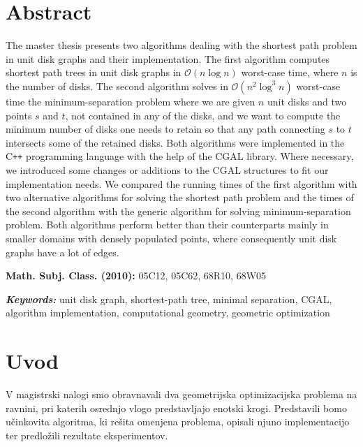 \documentclass[a4paper, 12pt]{book}
\newcommand{\OO}{\ensuremath{\mathcal{O}}} %
\newcommand{\clearemptydoublepage}{\newpage{\pagestyle{empty}\cleardoublepage}}
\begin{document}
\chapter*{Abstract}
The master thesis presents two algorithms dealing with the shortest path problem in unit disk graphs and their implementation. The first algorithm computes shortest path trees in unit disk graphs in $\OO(n\log n)$ worst-case time, where $n$ is the number of disks. The second algorithm solves in $\OO(n^2\log^3n)$ worst-case time the minimum-separation problem where we are given $n$ unit disks and two points $s$ and $t$, not contained in any of the disks, and we want to compute the minimum number of disks one needs to retain so that any path connecting $s$ to $t$ intersects some of the retained disks. Both algorithms were implemented in the C\texttt{+}\texttt{+} programming language with the help of the CGAL library. Where necessary, we introduced some changes or additions to the CGAL structures to fit our implementation needs. We compared the running times of the first algorithm with two alternative algorithms for solving the shortest path problem and the times of the second algorithm with the generic algorithm for solving minimum-separation problem. Both algorithms perform better than their counterparts mainly in smaller domains with densely populated points, where consequently unit disk graphs have a lot of edges.
\bigbreak

\begin{flushleft}
\textbf{Math. Subj. Class. (2010): } 05C12, 05C62, 68R10, 68W05

\textbf{\textit{Keywords: }}unit disk graph, shortest-path tree, minimal separation, CGAL, algorithm implementation, computational geometry, geometric optimization
\end{flushleft}


\clearemptydoublepage

\mainmatter
{}
\setcounter{page}{1}
\pagestyle{fancy}

\chapter{Uvod}
V magistrski nalogi smo obravnavali dva geometrijska optimizacijska problema na ravnini, pri katerih osrednjo vlogo predstavljajo enotski krogi. Predstavili bomo učinkovita algoritma, ki rešita omenjena problema, opisali njuno implementacijo ter predložili rezultate eksperimentov.
\end{document}
